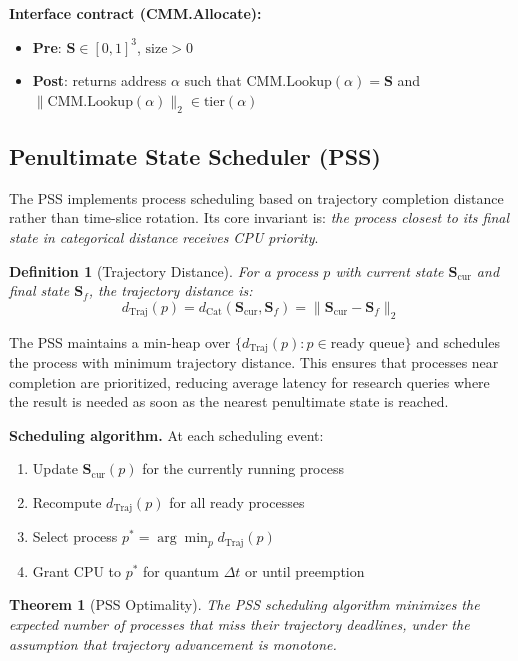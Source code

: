 \documentclass[12pt,twocolumn]{article}
\newtheorem{theorem}{Theorem}[section]
\newtheorem{definition}{Definition}[section]
\DeclareMathOperator{\Cat}{Cat}
\DeclareMathOperator{\Traj}{Traj}
\begin{document}
\textbf{Interface contract (CMM.Allocate):}
\begin{itemize}
\item \textbf{Pre}: $\mathbf{S} \in [0,1]^3$, $\text{size} > 0$
\item \textbf{Post}: returns address $\alpha$ such that $\text{CMM.Lookup}(\alpha) = \mathbf{S}$ and $\|\text{CMM.Lookup}(\alpha)\|_2 \in \text{tier}(\alpha)$
\end{itemize}

\subsection{Penultimate State Scheduler (PSS)}

The PSS implements process scheduling based on trajectory completion distance rather than time-slice rotation. Its core invariant is: \emph{the process closest to its final state in categorical distance receives CPU priority}.

\begin{definition}[Trajectory Distance]
For a process $p$ with current state $\mathbf{S}_{\text{cur}}$ and final state $\mathbf{S}_f$, the \emph{trajectory distance} is:
\begin{equation}
d_{\Traj}(p) = d_{\Cat}(\mathbf{S}_{\text{cur}}, \mathbf{S}_f) = \|\mathbf{S}_{\text{cur}} - \mathbf{S}_f\|_2
\end{equation}
\end{definition}

The PSS maintains a min-heap over $\{d_{\Traj}(p) : p \in \text{ready queue}\}$ and schedules the process with minimum trajectory distance. This ensures that processes near completion are prioritized, reducing average latency for research queries where the result is needed as soon as the nearest penultimate state is reached.

\textbf{Scheduling algorithm.} At each scheduling event:
\begin{enumerate}
\item Update $\mathbf{S}_{\text{cur}}(p)$ for the currently running process
\item Recompute $d_{\Traj}(p)$ for all ready processes
\item Select process $p^* = \arg\min_p d_{\Traj}(p)$
\item Grant CPU to $p^*$ for quantum $\Delta t$ or until preemption
\end{enumerate}

\begin{theorem}[PSS Optimality]
The PSS scheduling algorithm minimizes the expected number of processes that miss their trajectory deadlines, under the assumption that trajectory advancement is monotone.
\end{theorem}
\end{document}
